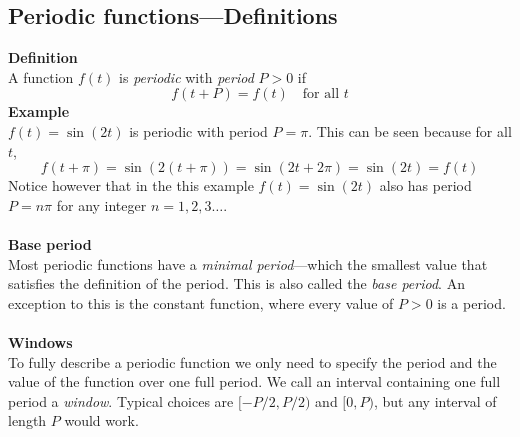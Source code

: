 \documentclass{report}
\begin{document}
\subsection{Periodic functions---Definitions}
\textbf{Definition}\\
A function $f(t)$ is \textit{periodic} with \textit{period} $P>0$ if
\begin{equation*}
f(t+P)=f(t)\quad\text{for all }t
\end{equation*}
\textbf{Example}\\
$f(t)=\sin(2t)$ is periodic with period $P=\pi$. This can be seen because for all $t$,
\begin{equation*}
f(t+\pi)=\sin(2(t+\pi))=\sin(2t+2\pi)=\sin(2t)=f(t)
\end{equation*}
Notice however that in the this example $f(t)=\sin(2t)$ also has period $P=n\pi$ for any integer $n=1,2,3\ldots$.\\
\vspace{1mm}\\
\textbf{Base period}\\
Most periodic functions have a \textit{minimal period}---which the smallest value that satisfies the definition
of the period. This is also called the \textit{base period}. An exception to this is the constant function,
where every value of $P>0$ is a period.\\
\vspace{1mm}\\
\textbf{Windows}\\
To fully describe a periodic function we only need to specify the period and the value of the function over
one full period. We call an interval containing one full
period a \textit{window}. Typical choices are $[-P/2,P/2)$ and $[0,P)$, but any interval of length $P$ would work.
\newpage
\end{document}
